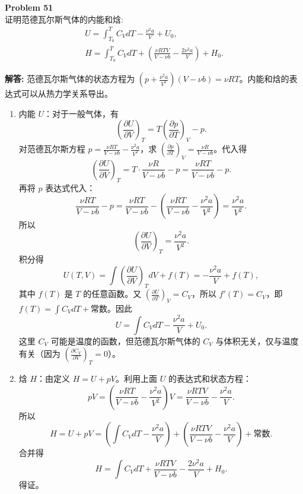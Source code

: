 \documentclass[12pt, a4paper, oneside]{ctexart}
\newenvironment{solution}{\par\noindent\textbf{解答:}\quad}{\par}
\begin{document}
\begin{mdframed}[backgroundcolor=gray!10, linewidth=0pt]
    \textbf{Problem 51} \\
    证明范德瓦尔斯气体的内能和焓:
    \[
    \begin{array}{c}
        U = \int_{T_0}^{T} C_V dT - \frac{\nu^2 a}{V} + U_0, \\
        H = \int_{T_0}^{T} C_V dT + \left( \frac{\nu R T V}{V - \nu b} - \frac{2\nu^2 a}{V} \right) + H_0.
    \end{array}
    \]
\end{mdframed}
\begin{solution}
    范德瓦尔斯气体的状态方程为 $\left(p + \frac{\nu^2 a}{V^2}\right)(V - \nu b) = \nu R T$。内能和焓的表达式可以从热力学关系导出。
    \begin{enumerate}
        \item 内能 $U$：对于一般气体，有
        \[
        \left(\frac{\partial U}{\partial V}\right)_T = T \left(\frac{\partial p}{\partial T}\right)_V - p.
        \]
        对范德瓦尔斯方程 $p = \frac{\nu R T}{V - \nu b} - \frac{\nu^2 a}{V^2}$，求 $\left(\frac{\partial p}{\partial T}\right)_V = \frac{\nu R}{V - \nu b}$。代入得
        \[
        \left(\frac{\partial U}{\partial V}\right)_T = T \cdot \frac{\nu R}{V - \nu b} - p = \frac{\nu R T}{V - \nu b} - p.
        \]
        再将 $p$ 表达式代入：
        \[
        \frac{\nu R T}{V - \nu b} - p = \frac{\nu R T}{V - \nu b} - \left( \frac{\nu R T}{V - \nu b} - \frac{\nu^2 a}{V^2} \right) = \frac{\nu^2 a}{V^2}.
        \]
        所以
        \[
        \left(\frac{\partial U}{\partial V}\right)_T = \frac{\nu^2 a}{V^2}.
        \]
        积分得
        \[
        U(T, V) = \int \left(\frac{\partial U}{\partial V}\right)_T dV + f(T) = -\frac{\nu^2 a}{V} + f(T),
        \]
        其中 $f(T)$ 是 $T$ 的任意函数。又 $\left(\frac{\partial U}{\partial T}\right)_V = C_V$，所以 $f'(T) = C_V$，即 $f(T) = \int C_V dT + \text{常数}$。因此
        \[
        U = \int C_V dT - \frac{\nu^2 a}{V} + U_0.
        \]
        这里 $C_V$ 可能是温度的函数，但范德瓦尔斯气体的 $C_V$ 与体积无关，仅与温度有关（因为 $\left(\frac{\partial C_V}{\partial V}\right)_T = 0$）。

        \item 焓 $H$：由定义 $H = U + pV$。利用上面 $U$ 的表达式和状态方程：
        \[
        pV = \left( \frac{\nu R T}{V - \nu b} - \frac{\nu^2 a}{V^2} \right) V = \frac{\nu R T V}{V - \nu b} - \frac{\nu^2 a}{V}.
        \]
        所以
        \[
        H = U + pV = \left( \int C_V dT - \frac{\nu^2 a}{V} \right) + \left( \frac{\nu R T V}{V - \nu b} - \frac{\nu^2 a}{V} \right) + \text{常数}.
        \]
        合并得
        \[
        H = \int C_V dT + \frac{\nu R T V}{V - \nu b} - \frac{2\nu^2 a}{V} + H_0.
        \]
        得证。
    \end{enumerate}
\end{solution}
\end{document}

